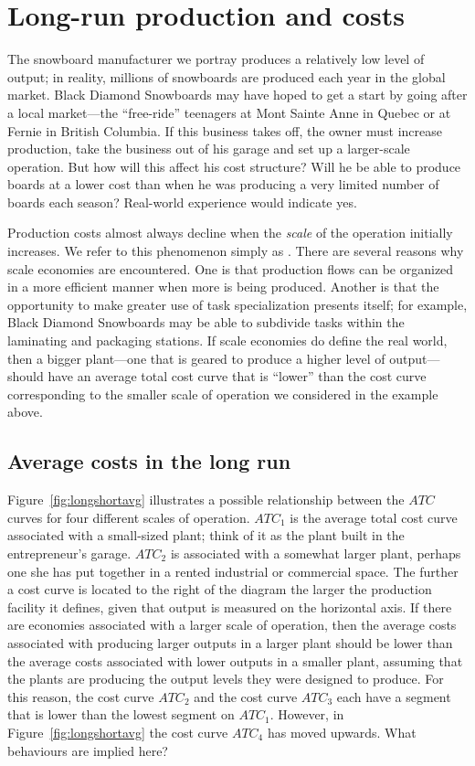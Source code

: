 \section{Long-run production and costs}\label{sec:ch8sec6}

The snowboard manufacturer we portray produces a relatively low level of
output; in reality, millions of snowboards are produced each year in the
global market. Black Diamond Snowboards may have hoped to get a start by
going after a local market---the ``free-ride'' teenagers at Mont Sainte Anne
in Quebec or at Fernie in British Columbia. If this business takes off, the
owner must increase production, take the business out of his garage and set
up a larger-scale operation. But how will this affect his cost structure?
Will he be able to produce boards at a lower cost than when he was producing
a very limited number of boards each season? Real-world experience would
indicate yes.

Production costs almost always decline when the \textit{scale} of the
operation initially increases. We refer to this phenomenon simply as %
. There are several reasons why scale
economies are encountered. One is that production flows can be organized in
a more efficient manner when more is being produced. Another is that the
opportunity to make greater use of task specialization presents itself; for
example, Black Diamond Snowboards may be able to subdivide tasks within the
laminating and packaging stations. If scale economies do define the real
world, then a bigger plant---one that is geared to produce a higher level of
output---should have an average total cost curve that is ``lower'' than the
cost curve corresponding to the smaller scale of operation we considered in
the example above.

\newhtmlpage

\subsection*{Average costs in the long run}

Figure~\ref{fig:longshortavg} illustrates a possible relationship between
the $ATC$ curves for four different scales of operation. $ATC_{1}$ is the
average total cost curve associated with a small-sized plant; think of it as
the plant built in the entrepreneur's garage. $ATC_{2}$ is associated with a
somewhat larger plant, perhaps one she has put together in a rented
industrial or commercial space. The further a cost curve is located to the
right of the diagram the larger the production facility it defines, given
that output is measured on the horizontal axis. If there are economies
associated with a larger scale of operation, then the average costs
associated with producing larger outputs in a larger plant should be lower
than the average costs associated with lower outputs in a smaller plant,
assuming that the plants are producing the output levels they were designed
to produce. For this reason, the cost curve $ATC_{2}$ and the cost curve 
$ATC_{3}$ each have a segment that is lower than the lowest segment on 
$ATC_{1}$. However, in Figure~\ref{fig:longshortavg} the cost curve $ATC_{4}$
has moved upwards. What behaviours are implied here?

